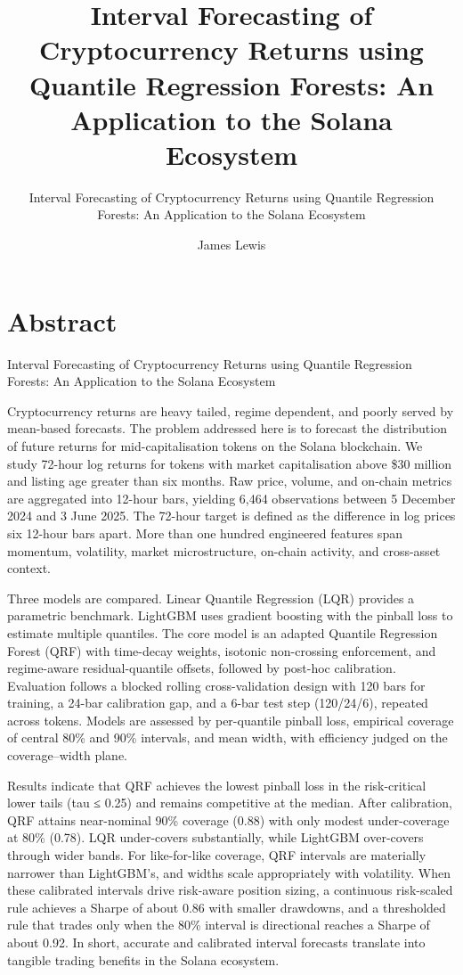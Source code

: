 \documentclass[
  a4paper,
  DIV=11,
  numbers=noendperiod]{scrreprt}
\title{Interval Forecasting of Cryptocurrency Returns using Quantile
Regression Forests: An Application to the Solana Ecosystem}
\subtitle{Interval Forecasting of Cryptocurrency Returns using Quantile
Regression Forests: An Application to the Solana Ecosystem}
\author{James Lewis}
\date{}
\renewcommand*\contentsname{Table of contents}
\newcommand\contentsname{Table of contents}
\begin{document}
\maketitle

\renewcommand*\contentsname{Table of contents}
{
\hypersetup{linkcolor=}
\setcounter{tocdepth}{2}
\tableofcontents
}


\chapter{Abstract}\label{abstract}

Interval Forecasting of Cryptocurrency Returns using Quantile Regression
Forests: An Application to the Solana Ecosystem

\hfill\break

Cryptocurrency returns are heavy tailed, regime dependent, and poorly
served by mean-based forecasts. The problem addressed here is to
forecast the distribution of future returns for mid-capitalisation
tokens on the Solana blockchain. We study 72-hour log returns for tokens
with market capitalisation above \$30 million and listing age greater
than six months. Raw price, volume, and on-chain metrics are aggregated
into 12-hour bars, yielding 6,464 observations between 5 December 2024
and 3 June 2025. The 72-hour target is defined as the difference in log
prices six 12-hour bars apart. More than one hundred engineered features
span momentum, volatility, market microstructure, on-chain activity, and
cross-asset context.

Three models are compared. Linear Quantile Regression (LQR) provides a
parametric benchmark. LightGBM uses gradient boosting with the pinball
loss to estimate multiple quantiles. The core model is an adapted
Quantile Regression Forest (QRF) with time-decay weights, isotonic
non-crossing enforcement, and regime-aware residual-quantile offsets,
followed by post-hoc calibration. Evaluation follows a blocked rolling
cross-validation design with 120 bars for training, a 24-bar calibration
gap, and a 6-bar test step (120/24/6), repeated across tokens. Models
are assessed by per-quantile pinball loss, empirical coverage of central
80\% and 90\% intervals, and mean width, with efficiency judged on the
coverage--width plane.

Results indicate that QRF achieves the lowest pinball loss in the
risk-critical lower tails (tau ≤ 0.25) and remains competitive at the
median. After calibration, QRF attains near-nominal 90\% coverage (0.88)
with only modest under-coverage at 80\% (0.78). LQR under-covers
substantially, while LightGBM over-covers through wider bands. For
like-for-like coverage, QRF intervals are materially narrower than
LightGBM's, and widths scale appropriately with volatility. When these
calibrated intervals drive risk-aware position sizing, a continuous
risk-scaled rule achieves a Sharpe of about 0.86 with smaller drawdowns,
and a thresholded rule that trades only when the 80\% interval is
directional reaches a Sharpe of about 0.92. In short, accurate and
calibrated interval forecasts translate into tangible trading benefits
in the Solana ecosystem.
\end{document}
